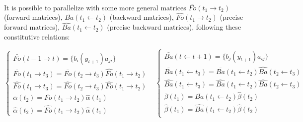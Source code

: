 \paragraph{}
It is possible to parallelize with some more general matrices $\bar{Fo}(t_1 \rightarrow t_2)$ (forward matrices), $\bar{Ba}(t_1 \leftarrow t_2)$ (backward matrices), $\hat{Fo}(t_1 \rightarrow t_2)$ (precise forward matrices), $\hat{Ba}(t_1 \leftarrow t_2)$ (precise backward matrices), following these constitutive relations:

\begin{equation}
\begin{cases}
\bar{Fo}( t - 1 \rightarrow t) =  \{b_i(y_{t+1})a_{ji}\} & \\
\bar{Fo}( t_1 \rightarrow t_3) =   \bar{Fo}( t_2 \rightarrow t_3) \hat{Fo}( t_1 \rightarrow t_2)& \\
\hat{Fo}( t_1 \rightarrow t_3) =   \hat{Fo}( t_2 \rightarrow t_3) \hat{Fo}( t_1 \rightarrow t_2)& \\
\bar{\alpha}(t_2) =  \bar{Fo}( t_1 \rightarrow t_2) \hat{\alpha}(t_1) & \\
\hat{\alpha}(t_2) =  \hat{Fo}( t_1 \rightarrow t_2) \hat{\alpha}(t_1) &
\end{cases}
\begin{cases}
\bar{Ba}( t \leftarrow t + 1) = \{b_j(y_{t+1})a_{ij}\} & \\
\bar{Ba}(t_1 \leftarrow t_3) = \bar{Ba}(t_1 \leftarrow t_2) \hat{Ba}(t_2 \leftarrow t_3) & \\
\hat{Ba}(t_1 \leftarrow t_3) = \hat{Ba}(t_1 \leftarrow t_2) \hat{Ba}(t_2 \leftarrow t_3) & \\
\bar{\beta}(t_1) =  \bar{Ba}( t_1 \leftarrow t_2) \hat{\beta}(t_2) & \\
\hat{\beta}(t_1) =  \hat{Ba}( t_1 \leftarrow t_2) \hat{\beta}(t_2) & \\
\end{cases}
\end{equation}

